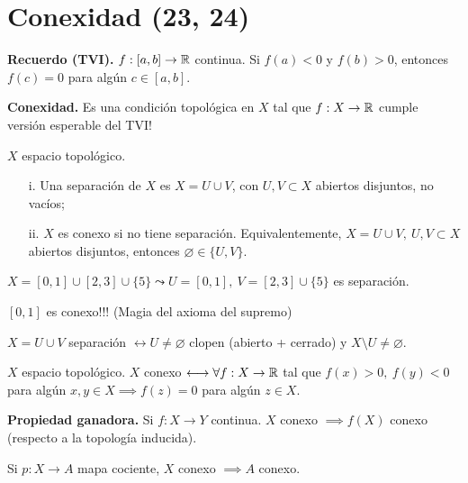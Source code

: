 \section{Conexidad (23, 24)}

\textbf{Recuerdo (TVI).} $f: [a,b] \to \mathbb{R}$ continua. Si $f(a) < 0$ y $f(b) > 0$, entonces $f(c) = 0$ para algún $c \in [a,b]$. \newline

\noindent \textbf{Conexidad.} Es una condición topológica en $X$ tal que $f: X \to \mathbb{R}$ cumple versión esperable del TVI!

\begin{definition}
	$X$ espacio topológico.
	\begin{enumerate}
		\item[i.] Una separación de $X$ es $X = U \cup V$, con $U,V \subset X$ abiertos disjuntos, no vacíos;

		\item[ii.] $X$ es conexo si no tiene separación. Equivalentemente, $X = U \cup V,\ U,V \subset X$ abiertos disjuntos, entonces $\varnothing \in \{ U, V \}$.
	\end{enumerate}
\end{definition}
\smallskip
\begin{eg}[i.]
	$X = [0,1] \cup [2,3] \cup \{5\} \leadsto U = [0,1],\ V = [2,3] \cup \{5\}$ es separación.   
\end{eg}
\smallskip
\begin{eg}[ii.]
	$[0,1]$ es conexo!!! (Magia del axioma del supremo)
\end{eg}
\smallskip
\begin{remark}
	$X = U \cup V$ separación $\longleftrightarrow U \neq \varnothing$ clopen (abierto + cerrado) y $X \setminus U \neq \varnothing$.
\end{remark}

\begin{lemma}
	$X$ espacio topológico. $X$ conexo $\longleftrightarrow \forall f: X \to \mathbb{R}$ tal que $f(x) > 0,\ f(y) < 0$ para algún $x,y \in X \implies f(z) = 0$ para algún $z \in X$.
\end{lemma}
\medskip
\noindent \textbf{Propiedad ganadora.} Si $f: X \to Y$ continua. $X$ conexo $\implies f(X)$ conexo (respecto a la topología inducida).

\begin{corollary}
	Si $p:X \to A$ mapa cociente, $X$ conexo $\implies A$ conexo.
\end{corollary}

